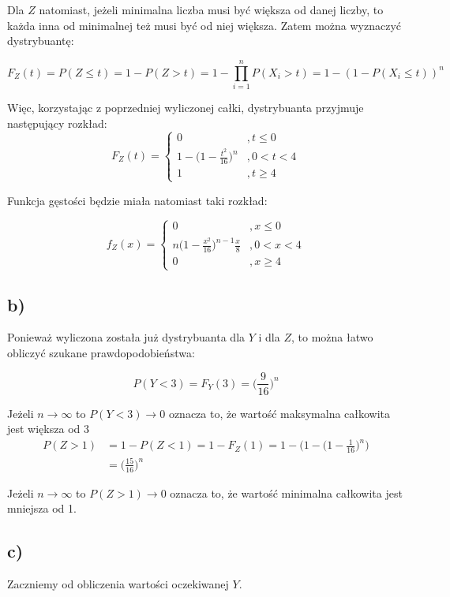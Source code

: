 \documentclass{article}
\begin{document}
Dla $Z$ natomiast, jeżeli minimalna liczba musi być większa od danej liczby, to każda inna od minimalnej też musi być od niej większa. Zatem można wyznaczyć dystrybuantę:

\[
F_Z(t) = P(Z \leq t) = 1 - P(Z > t) = 1 - \prod_{i=1}^{n} P(X_i > t) = 1 - ( 1 - P(X_i \leq t) )^n
\]

Więc, korzystając z poprzedniej wyliczonej całki, dystrybuanta przyjmuje następujący rozkład:
\[
F_Z(t) = \left\{
\begin{array}{ll}
0 &, t \leq 0 \\
1 - \Big(1 - \frac{t^2}{16} \Big)^n &, 0<t<4 \\
1 &, t \geq 4
\end{array}
\right.
\]

Funkcja gęstości będzie miała natomiast taki rozkład:

\[
f_Z(x) = \left\{
\begin{array}{ll}
0 &, x \leq 0 \\
n \Big(1 - \frac{x^2}{16} \Big)^{n-1} \frac{x}{8} &, 0<x<4 \\
0 &, x \geq 4
\end{array}
\right.
\]

\subsection*{b)}
Ponieważ wyliczona została już dystrybuanta dla $Y$ i dla $Z$, to można łatwo obliczyć szukane prawdopodobieństwa:

\[
P(Y<3) = F_Y(3) = \Big( \frac{9}{16} \Big)^n
\]

Jeżeli $n \rightarrow \infty$ to $P(Y<3) \rightarrow 0$ oznacza to, że wartość maksymalna całkowita jest większa od 3\\

\begin{align*}
P(Z>1) & = 1 - P(Z<1) = 1 - F_Z(1) = 1 - \Big( 1 - \Big( 1 - \frac{1}{16} \Big)^n \Big)  \\
& = \Big( \frac{15}{16} \Big)^n
\end{align*}

Jeżeli $n \rightarrow \infty$ to $P(Z>1) \rightarrow 0$ oznacza to, że wartość minimalna całkowita jest mniejsza od 1.

\subsection*{c)}
Zaczniemy od obliczenia wartości oczekiwanej $Y$.
\end{document}
